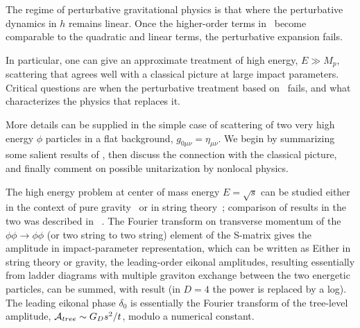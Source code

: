 The regime of perturbative gravitational physics is that where the perturbative dynamics in $h$ remains linear.  Once the higher-order terms in \gravpert\ become comparable to the quadratic and linear terms, the perturbative expansion fails.

In particular, one can give an approximate treatment of high energy, $E\gg M_p$, scattering that agrees well with a classical picture at large impact parameters.  Critical questions are when the perturbative treatment based on \gravpert\ fails, and what characterizes the physics that replaces it.



More details can be supplied in the simple case of scattering of two very high energy $\phi$ particles in a flat background, $g_{0\mu\nu}=\eta_{\mu\nu}$.  We begin by summarizing some salient results of 
, 
then discuss the connection with the classical picture, and finally comment on possible unitarization by nonlocal physics.  

The high energy problem  at center of mass energy $E=\sqrt s$ can be studied either in the context of pure gravity~ or in string theory~; comparison of results in the two was described in ~{\LQGST}.   The Fourier transform on transverse momentum of the $\phi\phi\rightarrow\phi\phi$ (or two string to two string) element of the S-matrix  gives the amplitude in impact-parameter representation, which can be written as
%
\eqn{}
%
Either in string theory or gravity, the leading-order eikonal amplitudes, resulting essentially from ladder diagrams with multiple graviton exchange between the two energetic particles, can be summed, with result
%
\eqn{}
%
(in $D=4$ the power is replaced by a log).  The leading eikonal phase $\delta_0$ is essentially the Fourier transform of the tree-level amplitude, ${\cal A}_{tree}\sim G_Ds^2/t$,
%
\eqn{}
%
modulo a numerical constant.

